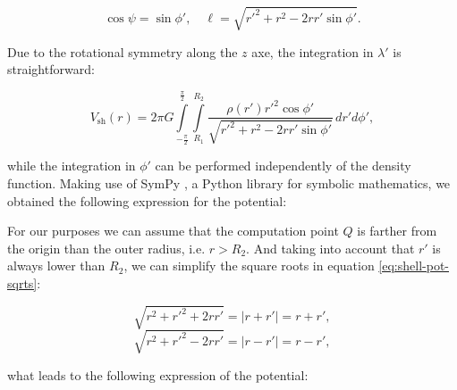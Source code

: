 \documentclass[extra]{gji}
\begin{document}
\begin{equation}
    \cos\psi = \sin\phi', \quad
    \ell = \sqrt{r'^2 + r^2 - 2 r r' \sin\phi'}.
\end{equation}

Due to the rotational symmetry along the $z$ axe, the integration in $\lambda'$ is straightforward:

\begin{equation}
    V_\text{sh}(r) = 2\pi G 
    \int\limits_{-\frac{\pi}{2}}^\frac{\pi}{2}
    \int\limits_{R_1}^{R_2}
    \frac{\rho(r') {r'}^2 \cos\phi'}{\sqrt{r'^2 + r^2 - 2 r r' \sin\phi'}}
    \, dr' d\phi',
\end{equation}

\noindent while the integration in $\phi'$ can be performed independently of the density function.
Making use of SymPy \citep{sympy2017}, a Python library for symbolic mathematics, we obtained the following expression for the potential:


For our purposes we can assume that the computation point $Q$ is farther from the origin than the outer radius, i.e. $r>R_2$. 
And taking into account that $r'$ is always lower than $R_2$, we can simplify the square roots in equation \ref{eq:shell-pot-sqrts}:

\begin{equation}
    \sqrt{r^2 + r'^2 + 2rr'} = |r + r'| = r + r',
\end{equation}
\begin{equation}
    \sqrt{r^2 + r'^2 - 2rr'} = |r - r'| = r - r',
\end{equation}

\noindent what leads to the following expression of the potential:
\end{document}
